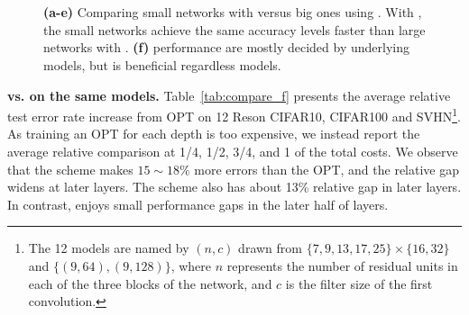 \begin{figure*}[t]
    \centering
    
    ~
    ~
    
    ~
    ~
    
    \caption{\textbf{(a-e)} Comparing small networks with \adaloss versus big ones using \const. With \adaloss, 
    the small networks achieve the same accuracy levels faster than large networks with \const. 
    \textbf{(f)} \anns performance are mostly decided by underlying models, but \adaloss is beneficial regardless models. }
    \label{fig:adaloss_vs_const_of_double_cost}
\end{figure*}
\textbf{\adaloss vs. \const on the same models.} Table~\ref{tab:compare_f} presents the average relative test error rate increase from OPT on 12  Res\anns on CIFAR10, CIFAR100 and SVHN\footnote{The 12 models are named by $(n,c)$ drawn from $\{ 7, 9, 13, 17, 25 \} \times \{ 16, 32 \}$ and $\{(9,64), (9,128)\}$, where $n$ represents the number of residual units in each of the three blocks of the network, and $c$ is the filter size of the first convolution.}. As training an OPT for each depth is too expensive, we instead report the average relative comparison at 1/4, 1/2, 3/4, and 1 of the total \ann costs. 
We observe that the \const scheme makes $15\sim 18\%$ more errors than the OPT, and the relative gap widens at later layers.  The \linear scheme also has about 13\% relative gap in later layers. In contrast, \adaloss enjoys small performance gaps in the later half of layers. 
